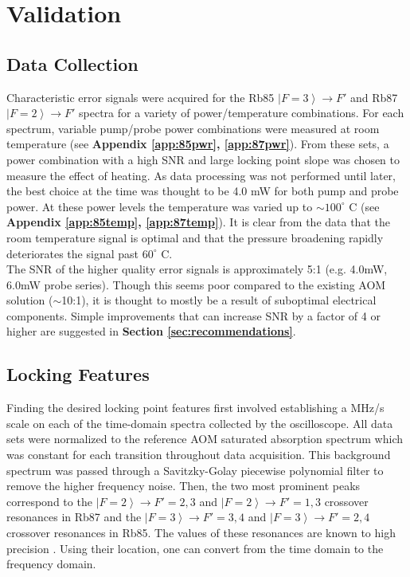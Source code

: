 \newpage
\section{Validation}
\label{sec:validation}

\subsection{Data Collection}

Characteristic error signals were acquired for the Rb85 $\left|F=3\right\rangle \rightarrow F'$ and Rb87 $\left|F=2\right\rangle \rightarrow F'$ spectra for a variety of power/temperature combinations. For each spectrum, variable pump/probe power combinations were measured at room temperature (see \textbf{Appendix \ref{app:85pwr}, \ref{app:87pwr}}). From these sets, a power combination with a high SNR and large locking point slope was chosen to measure the effect of heating. As data processing was not performed until later, the best choice at the time was thought to be 4.0 mW for both pump and probe power. At these power levels the temperature was varied up to $\sim 100^\circ$ C (see \textbf{Appendix \ref{app:85temp}, \ref{app:87temp}}). It is clear from the data that the room temperature signal is optimal and that the pressure broadening rapidly deteriorates the signal past $60^\circ$ C. \\

The SNR of the higher quality error signals is approximately 5:1 (e.g. 4.0mW, 6.0mW probe series). Though this seems poor compared to the existing AOM solution ($\sim$10:1), it is thought to mostly be a result of suboptimal electrical components. Simple improvements that can increase SNR by a factor of 4 or higher are suggested in \textbf{Section \ref{sec:recommendations}}.

\subsection{Locking Features}

Finding the desired locking point features first involved establishing a MHz/s scale on each of the time-domain spectra collected by the oscilloscope. All data sets were normalized to the reference AOM saturated absorption spectrum which was constant for each transition throughout data acquisition. This background spectrum was passed through a Savitzky-Golay piecewise polynomial filter to remove the higher frequency noise. Then, the two most prominent peaks correspond to the $\left|F=2\right\rangle \rightarrow F'=2,3$ and  $\left|F=2\right\rangle \rightarrow F'=1,3$ crossover resonances in Rb87 and the $\left|F=3\right\rangle \rightarrow F'=3,4$ and  $\left|F=3\right\rangle \rightarrow F'=2,4$ crossover resonances in Rb85.  The values of these resonances are known to high precision \cite{steckrb85, steckrb87}. Using their location, one can convert from the time domain to the frequency domain. \\

